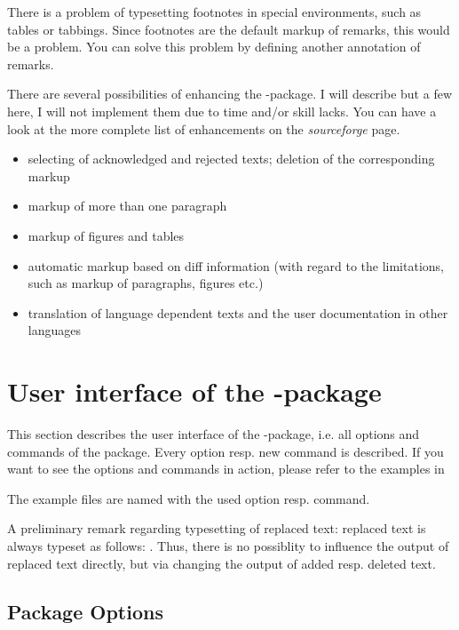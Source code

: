 There is a problem of typesetting footnotes in special environments, such as tables or tabbings.
Since footnotes are the default markup of remarks, this would be a problem.
You can solve this problem by defining another annotation of remarks.

There are several possibilities of enhancing the -package.
I will describe but a few here, I will not implement them due to time and/or skill lacks.
You can have a look at the more complete list of enhancements on the \emph{sourceforge} page.

\begin{itemize}
	\item selecting of acknowledged and rejected texts; deletion of the corresponding markup
	\item markup of more than one paragraph
	\item markup of figures and tables
	\item automatic markup based on diff information (with regard to the limitations, such as markup of paragraphs, figures etc.)
	\item translation of language dependent texts and the user documentation in other languages
\end{itemize}


\section{User interface of the -package}
\label{sec:user}

This section describes the user interface of the -package, i.e. all options and commands of the package.
Every option resp. new command is described.
If you want to see the options and commands in action, please refer to the examples in



The example files are named with the used option resp. command.

A preliminary remark regarding typesetting of replaced text: replaced text is always typeset as follows: .
Thus, there is no possiblity to influence the output of replaced text directly, but via changing the output of added resp. deleted text.


\subsection{Package Options}
\label{sec:user:options}

